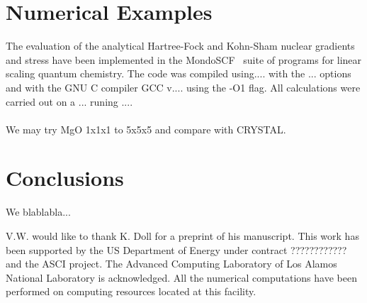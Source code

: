\documentclass[pra,aps,twocolumn,showkeys,twocolumngrid,superbib]{revtex4}
\begin{document}
\section{Numerical Examples}
The evaluation of the analytical Hartree-Fock and Kohn-Sham 
nuclear gradients and stress have been implemented in the 
MondoSCF~\cite{MondoSCF} suite of programs
for linear scaling quantum chemistry. The code was compiled using....
with the ... options and with the GNU C compiler GCC v....
using the -O1 flag. All calculations were carried out on a ...
runing ....\cite{TOPUT}
\\
\\
We may try MgO 1x1x1 to 5x5x5 and compare with CRYSTAL.

\section{Conclusions}
We blablabla...


\begin{acknowledgments}
 V.W. would like to thank K. Doll for a preprint of his manuscript.
 This work has been supported by the US Department of Energy 
 under contract ???????????? and the ASCI project.  
 The Advanced Computing Laboratory of Los 
 Alamos National Laboratory is acknowledged.
 All the numerical computations have been
 performed on computing resources located at this facility.
\end{acknowledgments}

\end{document}
